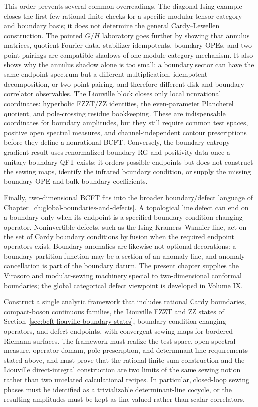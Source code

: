 This order prevents several common overreadings.  The diagonal Ising example
closes the first few rational finite checks for a specific modular tensor
category and boundary basis; it does not determine the general
Cardy--Lewellen construction.  The pointed \(G/H\) laboratory goes further by
showing that annulus matrices, quotient Fourier data, stabilizer
idempotents, boundary OPEs, and two-point pairings are compatible shadows of
one module-category mechanism.  It also shows why the annulus shadow alone is
too small: a boundary sector can have the same endpoint spectrum but a
different multiplication, idempotent decomposition, or two-point pairing, and
therefore different disk and boundary-correlator observables.  The Liouville
block closes only local nonrational coordinates: hyperbolic FZZT/ZZ
identities, the even-parameter Plancherel quotient, and pole-crossing residue
bookkeeping.  These are indispensable coordinates for boundary amplitudes,
but they still require common test spaces, positive open spectral measures,
and channel-independent contour prescriptions before they define a
nonrational BCFT.  Conversely, the boundary-entropy gradient result uses
renormalized boundary RG and positivity data once a unitary boundary QFT
exists; it orders possible endpoints but does not construct the sewing maps,
identify the infrared boundary condition, or supply the missing boundary OPE
and bulk-boundary coefficients.

Finally, two-dimensional BCFT fits into the broader boundary/defect language
of Chapter~\ref{ch:global-boundaries-and-defects}.  A topological line
defect can end on a boundary only when its endpoint is a specified boundary
condition-changing operator.  Noninvertible defects, such as the Ising
Kramers--Wannier line, act on the set of Cardy boundary conditions by fusion
when the required endpoint operators exist.  Boundary anomalies are likewise
not optional decorations: a boundary partition function may be a section of
an anomaly line, and anomaly cancellation is part of the boundary datum.
The present chapter supplies the Virasoro and modular-sewing machinery
special to two-dimensional conformal boundaries; the global categorical
defect viewpoint is developed in Volume IX.

\begin{openproblem}
\label{op:bcft-nonrational-sewing}
Construct a single analytic framework that includes rational Cardy
boundaries, compact-boson continuous families, the Liouville FZZT and ZZ
states of Section~\ref{sec:bcft-liouville-boundary-states},
boundary-condition-changing operators, and defect endpoints, with convergent
sewing maps for bordered Riemann surfaces.  The framework must realize the
test-space, open spectral-measure, operator-domain, pole-prescription, and
determinant-line requirements stated above, and must prove that the rational
finite-sum construction and the Liouville direct-integral construction are
two limits of the same sewing notion rather than two unrelated calculational
recipes.  In particular, closed-loop sewing phases must be identified as a
trivializable determinant-line cocycle, or the resulting amplitudes must be
kept as line-valued rather than scalar correlators.
\end{openproblem}
